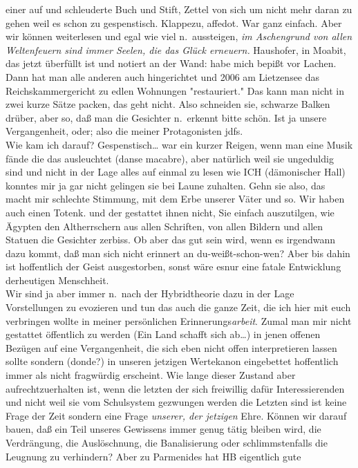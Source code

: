 \documentclass[
]{article}
\begin{document}
einer auf und schleuderte Buch und Stift, Zettel von sich um nicht mehr
daran zu gehen weil es schon zu gespenstisch. Klappezu, affedot. War
ganz einfach. Aber wir können weiterlesen und egal wie viel
n.~aussteigen, \emph{im Aschengrund von allen Weltenfeuern sind immer
Seelen, die das Glück erneuern.} Haushofer, in Moabit, das jetzt
überfüllt ist und notiert an der Wand: habe mich bepißt vor Lachen. Dann
hat man alle anderen auch hingerichtet und 2006 am Lietzensee das
Reichskammergericht zu edlen Wohnungen "restauriert." Das kann man nicht
in zwei kurze Sätze packen, das geht nicht. Also schneiden sie, schwarze
Balken drüber, aber so, daß man die Gesichter n.~erkennt bitte schön.
Ist ja unsere Vergangenheit, oder; also die meiner Protagonisten jdfs.\\
Wie kam ich darauf? Gespenstisch\ldots{} war ein kurzer Reigen, wenn man
eine Musik fände die das ausleuchtet (danse macabre), aber natürlich
weil sie ungeduldig sind und nicht in der Lage alles auf einmal zu lesen
wie ICH (dämonischer Hall) konntes mir ja gar nicht gelingen sie bei
Laune zuhalten. Gehn sie also, das macht mir schlechte Stimmung, mit dem
Erbe unserer Väter und so. Wir haben auch einen Totenk. und der
gestattet ihnen nicht, Sie einfach auszutilgen, wie Ägypten den
Altherrschern aus allen Schriften, von allen Bildern und allen Statuen
die Gesichter zerbiss. Ob aber das gut sein wird, wenn es irgendwann
dazu kommt, daß man sich nicht erinnert an du-weißt-schon-wen? Aber bis
dahin ist hoffentlich der Geist ausgestorben, sonst wäre esnur eine
fatale Entwicklung derheutigen Menschheit.\\
Wir sind ja aber immer n.~nach der Hybridtheorie dazu in der Lage
Vorstellungen zu evozieren und tun das auch die ganze Zeit, die ich hier
mit euch verbringen wollte in meiner persönlichen
Erinnerungs\emph{arbeit}. Zumal man mir nicht gestattet öffentlich zu
werden (Ein Land schafft sich ab\ldots) in jenen offenen Bezügen auf
eine Vergangenheit, die sich eben nicht offen interpretieren lassen
sollte sondern (donde?) in unseren jetzigen Wertekanon eingebettet
hoffentlich immer als nicht fragwürdig erscheint. Wie lange dieser
Zustand aber aufrechtzuerhalten ist, wenn die letzten der sich
freiwillig dafür Interessierenden und nicht weil sie vom Schulsystem
gezwungen werden die Letzten sind ist keine Frage der Zeit sondern eine
Frage \emph{unserer, der jetzigen} Ehre. Können wir darauf bauen, daß
ein Teil unseres Gewissens immer genug tätig bleiben wird, die
Verdrängung, die Auslöschnung, die Banalisierung oder schlimmstenfalls
die Leugnung zu verhindern? Aber zu Parmenides hat HB eigentlich gute
\end{document}
